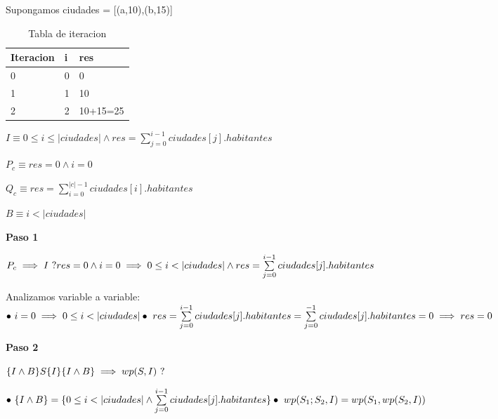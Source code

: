 \documentclass[10pt,a4paper]{article}
\begin{document}
\vspace{0.1cm}

\noindent Supongamos ciudades = [(a,10),(b,15)]

\begin{table}[h!]
	\begin{tabular}{| l | l | l |} 
		\hline
		Iteracion & i & res  \\ [0.5ex] 
		\hline
		0 & 0 & 0 \\ 
		1 & 1 & 10 \\
		2 & 2 & 10+15=25 \\
		\hline
	\end{tabular}
	\captionsetup{singlelinecheck=off}
	\caption{Tabla de iteracion}
	\label{tab:iteracion}
\end{table}

$I \equiv 0 \leq i \leq |ciudades| \wedge res = \sum\limits_{j=0}^{i-1} ciudades[j].habitantes$

$ P_c \equiv res = 0 \wedge i = 0$

$ Q_c \equiv res = \sum\limits_{i=0}^{|c|-1} ciudades[i].habitantes$

$ B \equiv i < |ciudades|$

\vspace{0.3cm}

\textbf{Paso 1}

\vspace{0.1cm}

\noindent$P_c \implies I \ ? \\ res = 0 \wedge i = 0 \implies 0 \leq i < |ciudades| \wedge res = \sum\limits_{j=0}^{i-1} ciudades[j].habitantes$

Analizamos variable a variable: \\ $\bullet \ i = 0 \implies 0 \leq i < |ciudades| \\ \bullet \ res = \sum\limits_{j=0}^{i-1} ciudades[j].habitantes = \sum\limits_{j=0}^{-1} ciudades[j].habitantes = 0 \implies res = 0 $

\vspace{0.3cm}

\textbf{Paso 2}

\vspace{0.1cm}

\noindent$\{I \wedge B\} S \{I\} \\ \{I \wedge B\} \implies wp(S,I) \ ?$

\noindent$\bullet \ \{I \wedge B\} = \{0 \leq i < |ciudades| \wedge \sum\limits_{j=0}^{i-1} ciudades[j].habitantes\} \\ \bullet \ wp(S_1;S_2,I) = wp(S_1,wp(S_2,I))$
\end{document}
